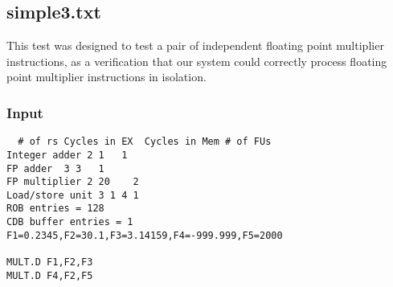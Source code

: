 \documentclass[12pt]{article}
\begin{document}
\subsection{simple3.txt}
This test was designed to test a pair of independent floating point multiplier instructions, as a verification that our system could correctly process floating point multiplier instructions in isolation.

\subsubsection*{Input}
\begin{verbatim}
  # of rs Cycles in EX  Cycles in Mem # of FUs
Integer adder 2 1   1
FP adder  3 3   1
FP multiplier 2 20    2
Load/store unit 3 1 4 1
ROB entries = 128
CDB buffer entries = 1
F1=0.2345,F2=30.1,F3=3.14159,F4=-999.999,F5=2000

MULT.D F1,F2,F3
MULT.D F4,F2,F5
\end{verbatim}
\end{document}
